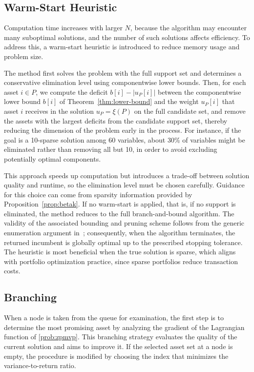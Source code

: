 \documentclass[11pt]{article}
\theoremstyle{plain}
\theoremstyle{definition}
\theoremstyle{plain}
\begin{document}
\subsection{Warm-Start Heuristic}\label{sec:BnBwarmstart}
Computation time increases with larger $N$, because the algorithm may encounter many suboptimal solutions, and the number of such solutions affects efficiency. To address this, a warm-start heuristic is introduced to reduce memory usage and problem size.

The method first solves the problem with the full support set and determines a conservative elimination level using componentwise lower bounds. Then, for each asset $i\in P$, we compute the deficit $b[i]-|u_P[i]|$ between the componentwise lower bound $b[i]$ of Theorem~\ref{thm:lower-bound} and the weight $u_P[i]$ that asset $i$ receives in the solution $u_P=\xi(P)$ on the full candidate set, and remove the assets with the largest deficits from the candidate support set, thereby reducing the dimension of the problem early in the process. For instance, if the goal is a 10-sparse solution among 60 variables, about 30\% of variables might be eliminated rather than removing all but 10, in order to avoid excluding potentially optimal components.

This approach speeds up computation but introduces a trade-off between solution quality and runtime, so the elimination level must be chosen carefully. Guidance for this choice can come from sparsity information provided by Proposition~\ref{prop:betak}. If no warm-start is applied, that is, if no support is eliminated,  the method reduces to the full branch-and-bound algorithm. The validity of the associated bounding and pruning scheme follows from the generic enumeration argument in~\cite[Appendix~B]{SenAkkayaPinar2025}; consequently, when the algorithm terminates, the returned incumbent is globally optimal up to the prescribed stopping tolerance. The heuristic is most beneficial when the true solution is sparse, which aligns with portfolio optimization practice, since sparse portfolios reduce transaction costs.
\subsection{Branching}
When a node is taken from the queue for examination, the first step is to determine the most promising asset by analyzing the gradient of the Lagrangian function of \eqref{prob:zpmvp}. This branching strategy evaluates the quality of the current solution and aims to improve it. If the selected asset set at a node is empty, the procedure is modified by choosing the index that minimizes the variance-to-return ratio.
\end{document}
